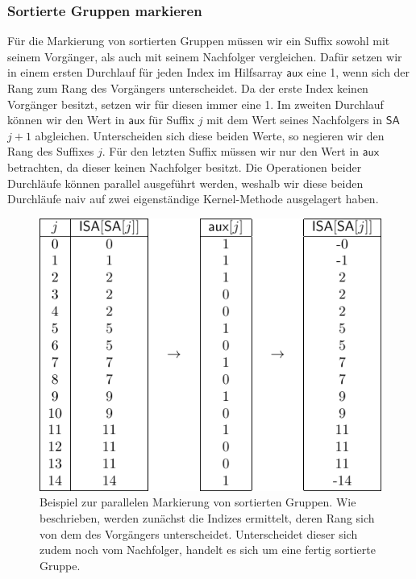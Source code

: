 \subsubsection{Sortierte Gruppen markieren}
Für die Markierung von sortierten Gruppen müssen wir ein Suffix sowohl mit seinem Vorgänger, als auch mit seinem Nachfolger vergleichen. Dafür setzen wir in einem ersten Durchlauf für jeden Index im Hilfsarray $\mathsf{aux}$ eine 1, wenn sich der Rang zum Rang des Vorgängers unterscheidet. Da der erste Index keinen Vorgänger besitzt, setzen wir für diesen immer eine 1. Im zweiten Durchlauf können wir den Wert in $\mathsf{aux}$ für Suffix $j$ mit dem Wert seines Nachfolgers in $\mathsf{SA}$ $j+1$ abgleichen. Unterscheiden sich diese beiden Werte, so negieren wir den Rang des Suffixes $j$. Für den letzten Suffix müssen wir nur den Wert in $\mathsf{aux}$ betrachten, da dieser keinen Nachfolger besitzt.
Die Operationen beider Durchläufe können parallel ausgeführt werden, weshalb wir diese beiden Durchläufe naiv auf zwei eigenständige Kernel-Methode ausgelagert haben.
\begin{center}
\begin{figure}
\includegraphics[scale=1]{kapitel/saca_algorithmen/osipov/mark_singletons_example.pdf}
\caption{Beispiel zur parallelen Markierung von sortierten Gruppen. Wie beschrieben, werden zunächst die Indizes ermittelt, deren Rang sich von dem des Vorgängers unterscheidet. Unterscheidet dieser sich zudem noch vom Nachfolger, handelt es sich um eine fertig sortierte Gruppe.}
\end{figure}

\end{center}
